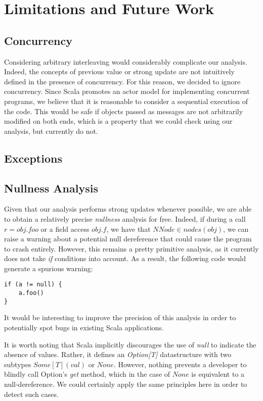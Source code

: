 \chapter{Limitations and Future Work}
\label{chap:conclusion}
\section{Concurrency}
Considering arbitrary interleaving would considerably complicate our analysis.
Indeed, the concepts of previous value or strong update are not intuitively
defined in the presence of concurrency. For this reason, we decided to ignore
concurrency. Since Scala promotes an actor model for implementing concurrent
programs, we believe that it is reasonable to consider a sequential execution
of the code. This would be safe if objects passed as messages are not
arbitrarily modified on both ends, which is a property that we could check
using our analysis, but currently do not.

\section{Exceptions}

\section{Nullness Analysis}
Given that our analysis performs strong updates whenever possible, we are able
to obtain a relatively precise \emph{nullness} analysis for free. Indeed, if during
a call $r = obj.foo$ or a field access $obj.f$, we have that $NNode \in
nodes(obj)$, we can raise a warning about a potential null dereference that
could cause the program to crash entirely. However, this remains a pretty
primitive analysis, as it currently does not take \emph{if} conditions into
account. As a result, the following code would generate a spurious warning:
\begin{lstlisting}
if (a != null) {
    a.foo()
}
\end{lstlisting}
It would be interesting to improve the precision of this analysis in order to
potentially spot bugs in existing Scala applications.

It is worth noting that Scala implicitly discourages the use of \emph{null} to
indicate the absence of values. Rather, it defines an \emph{Option[T]}
datastructure with two subtypes $Some[T](val)$ or $None$. However,
nothing prevents a developer to blindly call Option's \emph{get} method, which
in the case of $None$ is equivalent to a null-dereference. We could certainly
apply the same principles here in order to detect such cases.

